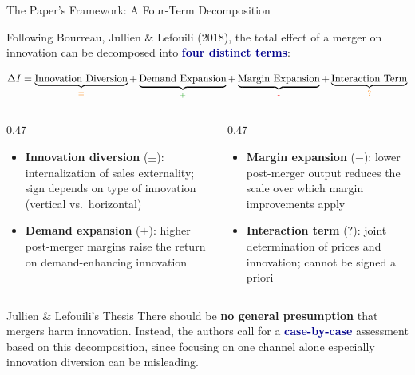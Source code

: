 \documentclass[10pt, aspectratio=169]{beamer}
\newcommand{\pos}[1]{\textcolor{softgreen}{#1}}
\newcommand{\negg}[1]{\textcolor{softred}{#1}}
\newcommand{\amb}[1]{\textcolor{softorange}{#1}}
\newcommand{\highlight}[1]{\textcolor{darkblue}{\textbf{#1}}}
\begin{document}
\begin{frame}{The Paper's Framework: A Four-Term Decomposition}
\small

Following Bourreau, Jullien \& Lefouili (2018), the total effect of a merger on innovation can be decomposed into \highlight{four distinct terms}:

\vspace{0.5em}
\[
\Delta I
=
\underbrace{\text{Innovation Diversion}}_{\text{\color{orange}$\pm$}}
+
\underbrace{\text{Demand Expansion}}_{\text{\color{green!60!black}+}}
+
\underbrace{\text{Margin Expansion}}_{\text{\color{red}-}}
+
\underbrace{\text{Interaction Term}}_{\text{\color{orange}?}}
\]

\vspace{0.3em}
\begin{columns}[T,onlytextwidth]
\begin{column}{0.47\textwidth}

\begin{itemize}
    \setlength{\itemsep}{0.3em}
    \item \textbf{Innovation diversion} {\footnotesize (\amb{$\pm$})}: internalization of sales externality; sign depends on type of innovation (vertical vs.\ horizontal)
    \item \textbf{Demand expansion} {\footnotesize (\pos{$+$})}: higher post-merger margins raise the return on demand-enhancing innovation
\end{itemize}

\end{column}
\begin{column}{0.47\textwidth}

\begin{itemize}
    \setlength{\itemsep}{0.3em}
    \item \textbf{Margin expansion} {\footnotesize (\negg{$-$})}: lower post-merger output reduces the scale over which margin improvements apply
    \item \textbf{Interaction term} {\footnotesize (\amb{$?$})}: joint determination of prices and innovation; cannot be signed a priori
\end{itemize}

\end{column}
\end{columns}

\vspace{0.35em}
\begin{exampleblock}{Jullien \& Lefouili's Thesis}
There should be \textbf{no general presumption} that mergers harm innovation. Instead, the authors call for a \highlight{case-by-case} assessment based on this decomposition, since focusing on one channel alone especially innovation diversion can be misleading.
\end{exampleblock}

\end{frame}
\end{document}
